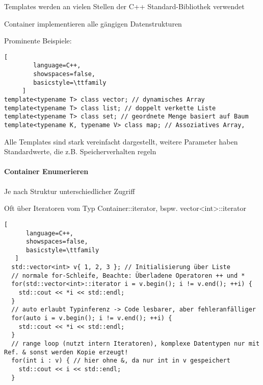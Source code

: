 \documentclass[10pt]{article}
\begin{document}
\begin{itemize*}
  \item Templates werden an vielen Stellen der C++ Standard-Bibliothek verwendet
  \item Container implementieren alle gängigen Datenstrukturen
  \item Prominente Beispiele:
  \begin{lstlisting}[
        language=C++,
        showspaces=false,
        basicstyle=\ttfamily
     ]
template<typename T> class vector; // dynamisches Array
template<typename T> class list; // doppelt verkette Liste
template<typename T> class set; // geordnete Menge basiert auf Baum
template<typename K, typename V> class map; // Assoziatives Array,
\end{lstlisting}
  \item Alle Templates sind stark vereinfacht dargestellt, weitere Parameter haben Standardwerte, die z.B. Speicherverhalten regeln
\end{itemize*}


\paragraph{Container Enumerieren}
\begin{itemize*}
  \item Je nach Struktur unterschiedlicher Zugriff
  \item Oft über Iteratoren vom Typ Container::iterator, bspw. vector<int>::iterator
\end{itemize*}
\begin{lstlisting}[
      language=C++,
      showspaces=false,
      basicstyle=\ttfamily
   ]
  std::vector<int> v{ 1, 2, 3 }; // Initialisierung über Liste
  // normale for-Schleife, Beachte: Überladene Operatoren ++ und *
  for(std::vector<int>::iterator i = v.begin(); i != v.end(); ++i) {
    std::cout << *i << std::endl;
  }
  // auto erlaubt Typinferenz -> Code lesbarer, aber fehleranfälliger
  for(auto i = v.begin(); i != v.end(); ++i) {
    std::cout << *i << std::endl;
  }
  // range loop (nutzt intern Iteratoren), komplexe Datentypen nur mit Ref. & sonst werden Kopie erzeugt!
  for(int i : v) { // hier ohne &, da nur int in v gespeichert
    std::cout << i << std::endl;
  }
  \end{lstlisting}
\end{document}
